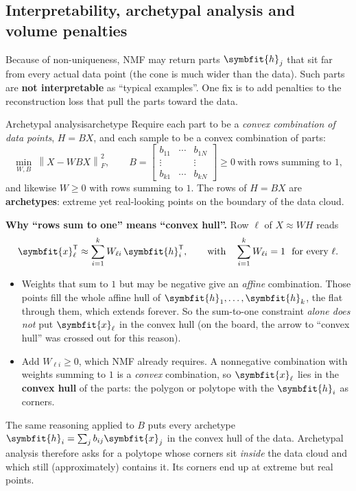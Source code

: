 \documentclass[11pt]{article}
\newcommand{\bm}[1]{\symbfit{#1}}
\newcommand{\vx}{\bm{x}}
\newcommand{\vh}{\bm{h}}
\newcommand{\T}{^{\mathsf T}}
\newcommand{\Fro}[1]{\left\lVert #1\right\rVert_F}
\begin{document}
\subsection{Interpretability, archetypal analysis and volume penalties}

Because of non-uniqueness, NMF may return parts $\vh_j$ that sit far from every actual data
point (the cone is much wider than the data). Such parts are \textbf{not interpretable} as
``typical examples''. One fix is to add penalties to the reconstruction loss that pull the
parts toward the data.

\begin{definition}{Archetypal analysis}{archetype}
Require each part to be a \emph{convex combination of data points}, $H=BX$, and each
sample to be a convex combination of parts:
\[
\min_{W,B}\ \Fro{X-WBX}^2,\qquad
B=\begin{bmatrix}b_{11}&\cdots&b_{1N}\\\vdots&&\vdots\\b_{k1}&\cdots&b_{kN}\end{bmatrix}\ge0\ \text{with rows summing to }1,
\]
and likewise $W\ge0$ with rows summing to $1$. The rows of $H=BX$ are
\textbf{archetypes}: extreme yet real-looking points on the boundary of the data cloud.
\end{definition}

\textbf{Why ``rows sum to one'' means ``convex hull''.} Row $\ell$ of $X\approx WH$ reads
\[
\vx_\ell\T\approx\sum_{i=1}^{k}W_{\ell i}\,\vh_i\T,\qquad\text{with}\quad \sum_{i=1}^{k}W_{\ell i}=1\ \ \text{for every }\ell .
\]
\begin{itemize}[nosep]
\item Weights that sum to $1$ but may be negative give an \emph{affine} combination. Those
points fill the whole affine hull of $\vh_1,\dots,\vh_k$, the flat through them, which
extends forever. So the sum-to-one constraint \emph{alone does not} put $\vx_\ell$ in the
convex hull (on the board, the arrow to ``convex hull'' was crossed out for this reason).
\item Add $W_{\ell i}\ge0$, which NMF already requires. A nonnegative combination with
weights summing to $1$ is a \emph{convex} combination, so $\vx_\ell$ lies in the
\textbf{convex hull} of the parts: the polygon or polytope with the $\vh_i$ as
corners.
\end{itemize}
The same reasoning applied to $B$ puts every archetype $\vh_i=\sum_jb_{ij}\vx_j$ in the
convex hull of the data. Archetypal analysis therefore asks for a polytope whose corners
sit \emph{inside} the data cloud and which still (approximately) contains it. Its corners
end up at extreme but real points.
\end{document}
